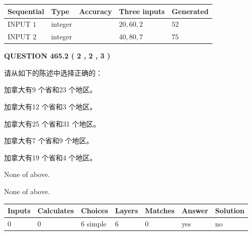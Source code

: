 \documentclass{ctexart}
\begin{document}
   
  
  
\noindent\begin{tabular}{|l|l|l|l|l|}
\hline
 Sequential & Type & Accuracy & Three inputs & Generated \\ 
\hline
 
 
  INPUT $  1 $ & integer &  & $
 20
 , 
 60
 , 
 2
 $ & $ 52 $ 
 \\  \hline  
 
 
  INPUT $  2 $ & integer &  & $
 40
 , 
 80
 , 
 7
 $ & $ 75 $ 
 \\  \hline  
 \end{tabular}
   
   
  
\vspace{0.2in}
  
{\textbf{\Large{QUESTION
465.2 
 ( 2 , 2 , 3 )
}}}
  
  
请从如下的陈述中选择正确的：
 
 
加拿大有9 个省和23 个地区。
 
 
加拿大有12 个省和3 个地区。
 
 
加拿大有25 个省和31 个地区。
 
 
加拿大有7 个省和9 个地区。
 
 
加拿大有19 个省和4 个地区。
 
 
 None of above.
 
 
\noindent{}
 
 
 None of above.
 
 
\noindent{}
 
 
   
   
   
   
\noindent\begin{tabular}{|l|l|l|l|l|l|l|}
 \hline
Inputs & Calculates & Choices & Layers & Matches & Answer & Solution \\ \hline
 0  & 
 0  & 
 6
  simple  
  & 
 6  & 
 0  & 
  yes & 
  no 
  \\ \hline
 \end{tabular}
   
   
   
   
\noindent{}
   
\end{document}
